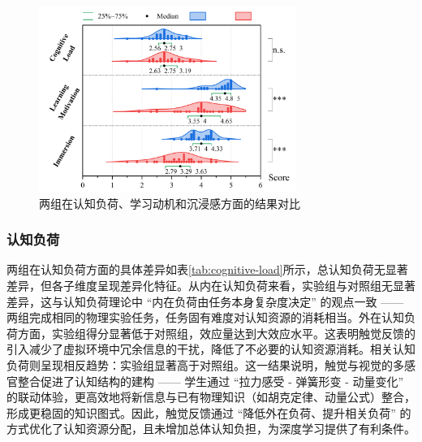 \documentclass[runningheads]{llncs}
\begin{document}
\begin{figure}[t]
  \centering
  \includegraphics[width=0.75\textwidth]{image/user-experience-result.pdf}
  \caption{两组在认知负荷、学习动机和沉浸感方面的结果对比}
  \label{fig:user-experience-result}
\end{figure}

\subsubsection{认知负荷}
两组在认知负荷方面的具体差异如表\ref{tab:cognitive-load}所示，总认知负荷无显著差异，但各子维度呈现差异化特征。从内在认知负荷来看，实验组与对照组无显著差异，这与认知负荷理论中 “内在负荷由任务本身复杂度决定” 的观点一致 —— 两组完成相同的物理实验任务，任务固有难度对认知资源的消耗相当。外在认知负荷方面，实验组得分显著低于对照组，效应量达到大效应水平。这表明触觉反馈的引入减少了虚拟环境中冗余信息的干扰，降低了不必要的认知资源消耗。相关认知负荷则呈现相反趋势：实验组显著高于对照组。这一结果说明，触觉与视觉的多感官整合促进了认知结构的建构 —— 学生通过 “拉力感受 - 弹簧形变 - 动量变化” 的联动体验，更高效地将新信息与已有物理知识（如胡克定律、动量公式）整合，形成更稳固的知识图式。因此，触觉反馈通过 “降低外在负荷、提升相关负荷” 的方式优化了认知资源分配，且未增加总体认知负担，为深度学习提供了有利条件。
\end{document}
